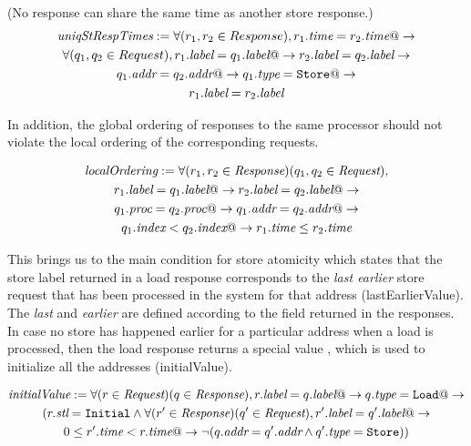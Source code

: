 \begin{defn} (No response can share the same time as another store response.)
\begin{multline*}
\textit{uniqStRespTimes} := 
\forall (r_1, r_2 \in Response), r_1.\textit{time} = r_2.\textit{time} @-> \\
\forall (q_1, q_2 \in Request), r_1.\textit{label} = q_1.\textit{label} @->
r_2.\textit{label} = q_2.\textit{label} -> \\
q_1.\textit{addr} = q_2.\textit{addr} @-> q_1.\textit{type} = \texttt{Store} @-> \\ r_1.\textit{label} = r_2.\textit{label}
\end{multline*}
\end{defn}

In addition, the global ordering of responses to the same processor should not
violate the local ordering of the corresponding requests.
\begin{defn}
\begin{multline*}
\textit{localOrdering} :=
\forall (r_1, r_2 \in \textit{Response}) (q_1, q_2 \in \textit{Request}), \\ r_1.\textit{label}
= q_1.\textit{label} @-> r_2.\textit{label} = q_2.\textit{label} @-> \\ q_1.\textit{proc} = q_2.\textit{proc} @->
q_1.\textit{addr} = q_2.\textit{addr} @-> \\ q_1.\textit{index} < q_2.\textit{index} @-> r_1.\textit{time} \le r_2.\textit{time}
\end{multline*}
\end{defn}

This brings us to the main condition for store atomicity which states that the
store label returned in a load response corresponds to the \emph{last earlier}
store request that has been processed in the system for that address (lastEarlierValue). The
\emph{last} and \emph{earlier} are defined according to the field \mytime{}
returned in the responses. In case no store has happened earlier for a
particular address when a load is processed, then the load response returns a
special value \Initial, which is used to initialize all the addresses (initialValue).

\begin{defn}
\begin{multline*}
\textit{initialValue}:= \forall (r \in \textit{Request}) (q \in \textit{Response}), r.\textit{label} = q.\textit{label} @->
q.\textit{type} = \texttt{Load} @-> \\(r.\textit{stl} = \texttt{Initial} \wedge
\forall (r' \in \textit{Response}) (q' \in \textit{Request}),
r'.\textit{label} = q'.\textit{label} @-> \\ 0 \le r'.\textit{time} < r.\textit{time} @->
\neg (q.\textit{addr} = q'.\textit{addr} \wedge q'.\textit{type} = \texttt{Store}))
\end{multline*}
\end{defn}


